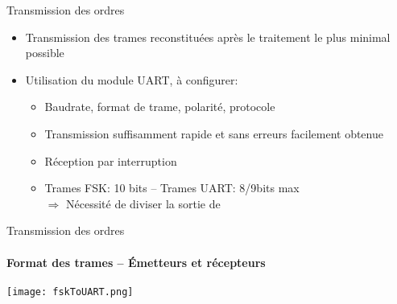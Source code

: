 \begin{frame}
  \tableofcontents[currentsection]
\end{frame}

\begin{frame}{Transmission des ordres}
\begin{itemize}
  \item Transmission des trames reconstituées après le traitement le plus minimal possible
  \item Utilisation du module UART, à configurer:
  \begin{itemize}
    \item Baudrate, format de trame, polarité, protocole
    \item Transmission suffisamment rapide et sans erreurs facilement obtenue
    \item Réception par interruption
    \item Trames FSK: 10 bits -- Trames UART: 8/9bits max\\
    $\Rightarrow$ Nécessité de diviser la sortie de 
  \end{itemize}
\end{itemize}
\end{frame}

\begin{frame}{Transmission des ordres}
\framesubtitle{Format des trames -- \'Emetteurs et récepteurs}
  \texttt{[image: fskToUART.png]}
\end{frame}

